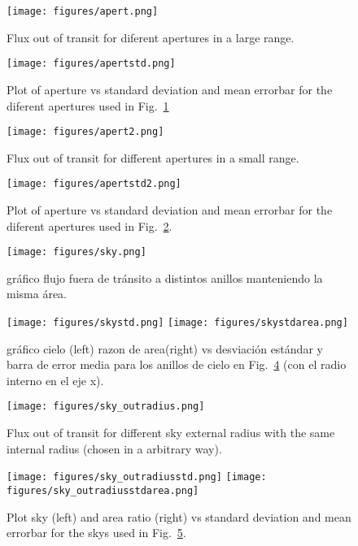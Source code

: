 \documentclass{article}
\newenvironment{cfigure}{
  \begin{figure}
    \begin{center}
}
{
    \end{center}
  \end{figure}
}
\begin{document}
\clearpage

\begin{cfigure}
  \texttt{[image: figures/apert.png]}
  \caption{Flux out of transit for diferent apertures in a large range. \label{flux1}}
\end{cfigure}
\begin{cfigure}
  \texttt{[image: figures/apertstd.png]}
  \caption{Plot of aperture vs standard deviation and mean errorbar for
  the diferent apertures used in Fig.\ \ref{flux1}}
\end{cfigure}

\clearpage

\begin{cfigure}
  \texttt{[image: figures/apert2.png]}
  \caption{Flux out of transit for different apertures in a small range. \label{flux2}}
\end{cfigure}
\begin{cfigure}
  \texttt{[image: figures/apertstd2.png]}
  \caption{Plot of aperture vs standard deviation and mean errorbar for
  the diferent apertures used in Fig.\ \ref{flux2}. \label{flux2std}}
\end{cfigure}

\clearpage

\begin{cfigure}
  \texttt{[image: figures/sky.png]}
  \caption{gráfico flujo fuera de tránsito a distintos anillos manteniendo la misma área.\label{sky}}
\end{cfigure}
\begin{cfigure}
  \texttt{[image: figures/skystd.png]}
  \texttt{[image: figures/skystdarea.png]}
  \caption{gráfico cielo (left) razon de area(right) vs desviación estándar y barra de error media para los anillos de cielo en Fig.\ \ref{sky} (con el radio interno en el eje x).}
\end{cfigure}

\clearpage

\begin{cfigure}
  \texttt{[image: figures/sky\_outradius.png]}
  \caption{Flux out of transit for different sky external radius with the same internal radius (chosen in a arbitrary way).\label{sky_inrad}}
\end{cfigure}
\begin{cfigure}
  \texttt{[image: figures/sky\_outradiusstd.png]}
  \texttt{[image: figures/sky\_outradiusstdarea.png]}
  \caption{Plot sky (left) and area ratio (right) vs standard deviation and mean errorbar for the skys used in Fig.\ \ref{sky_inrad}.\label{sky_inradstd}}
\end{cfigure}
\end{document}
